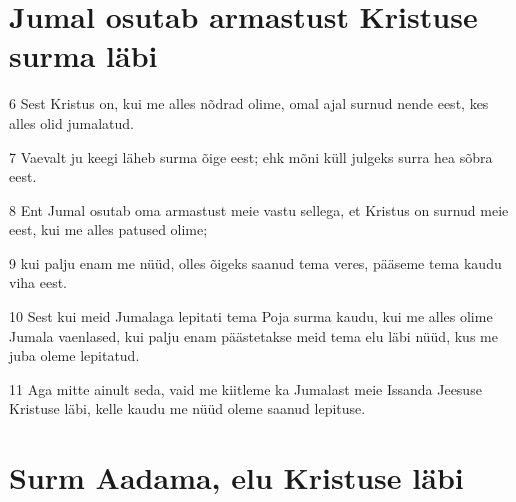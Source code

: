 \section*{Jumal osutab armastust Kristuse surma läbi}

\par 6 Sest Kristus on, kui me alles nõdrad olime, omal ajal surnud nende eest, kes alles olid jumalatud.
\par 7 Vaevalt ju keegi läheb surma õige eest; ehk mõni küll julgeks surra hea sõbra eest.
\par 8 Ent Jumal osutab oma armastust meie vastu sellega, et Kristus on surnud meie eest, kui me alles patused olime;
\par 9 kui palju enam me nüüd, olles õigeks saanud tema veres, pääseme tema kaudu viha eest.
\par 10 Sest kui meid Jumalaga lepitati tema Poja surma kaudu, kui me alles olime Jumala vaenlased, kui palju enam päästetakse meid tema elu läbi nüüd, kus me juba oleme lepitatud.
\par 11 Aga mitte ainult seda, vaid me kiitleme ka Jumalast meie Issanda Jeesuse Kristuse läbi, kelle kaudu me nüüd oleme saanud lepituse.

\section*{Surm Aadama, elu Kristuse läbi}

